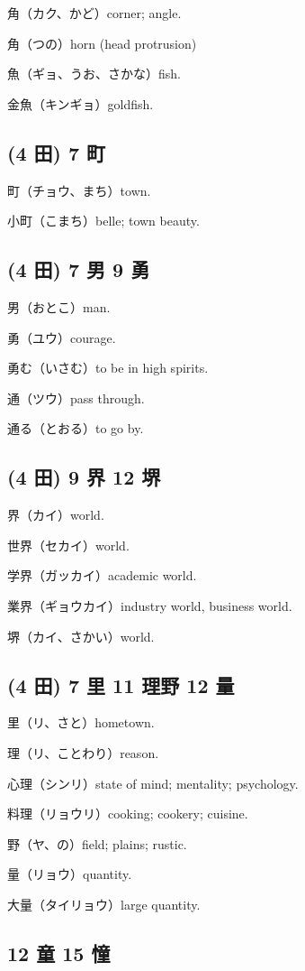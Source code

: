 角（カク、かど）corner; angle.

角（つの）horn (head protrusion)

魚（ギョ、うお、さかな）fish.

金魚（キンギョ）goldfish.

\subsection{(4 田) 7 町}

町（チョウ、まち）town.

小町（こまち）belle; town beauty.

\subsection{(4 田) 7 男 9 勇}

男（おとこ）man.

勇（ユウ）courage.

勇む（いさむ）to be in high spirits.

通（ツウ）pass through.

通る（とおる）to go by.

\subsection{(4 田) 9 界 12 堺}

界（カイ）world.

世界（セカイ）world.

学界（ガッカイ）academic world.

業界（ギョウカイ）industry world, business world.

堺（カイ、さかい）world.

\subsection{(4 田) 7 里 11 理野 12 量}

里（リ、さと）hometown.

理（リ、ことわり）reason.

心理（シンリ）state of mind; mentality; psychology.

料理（リョウリ）cooking; cookery; cuisine.

野（ヤ、の）field; plains; rustic.

量（リョウ）quantity.

大量（タイリョウ）large quantity.

\subsection{12 童 15 憧}

